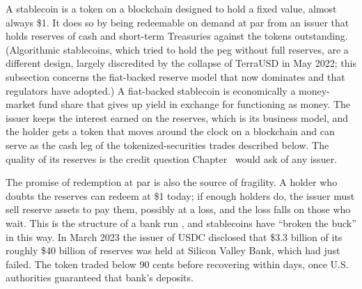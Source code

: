 \documentclass[../ai_in_finance]{subfiles}
\begin{document}
A stablecoin is a token on a blockchain designed to hold a fixed value, almost always \$1. It does so by being redeemable on demand at par from an issuer that holds reserves of cash and short-term Treasuries against the tokens outstanding. (Algorithmic stablecoins, which tried to hold the peg without full reserves, are a different design, largely discredited by the collapse of TerraUSD in May 2022; this subsection concerns the fiat-backed reserve model that now dominates and that regulators have adopted.) A fiat-backed stablecoin is economically a money-market fund share that gives up yield in exchange for functioning as money. The issuer keeps the interest earned on the reserves, which is its business model, and the holder gets a token that moves around the clock on a blockchain and can serve as the cash leg of the tokenized-securities trades described below. The quality of its reserves is the credit question Chapter~ would ask of any issuer.

The promise of redemption at par is also the source of fragility. A holder who doubts the reserves can redeem at \$1 today; if enough holders do, the issuer must sell reserve assets to pay them, possibly at a loss, and the loss falls on those who wait. This is the structure of a bank run \parencite{diamond1983bank}, and stablecoins have ``broken the buck'' in this way. In March 2023 the issuer of USDC disclosed that \$3.3 billion of its roughly \$40 billion of reserves was held at Silicon Valley Bank, which had just failed. The token traded below 90 cents before recovering within days, once U.S. authorities guaranteed that bank's deposits.
\end{document}
